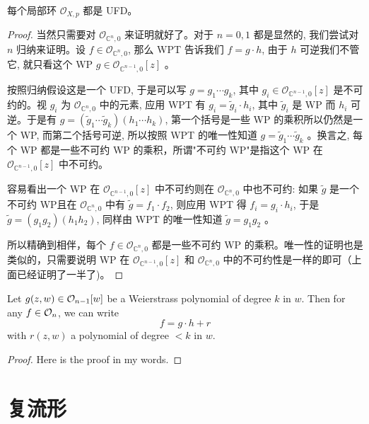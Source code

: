 \documentclass[lang=cn,12pt,a4paper,fontset=none]{beautybook}
\begin{document}
\begin{corollary}
   每个局部环 $\mathcal{O}_{X, p}$ 都是 UFD。
\end{corollary}
\begin{proof}
当然只需要对 $\mathcal{O}_{\mathbb{C}^n, 0}$ 来证明就好了。对于 $n=0,1$ 都是显然的, 我们尝试对 $n$ 归纳来证明。设 $f \in \mathcal{O}_{\mathbb{C}^n, 0}$, 那么 WPT 告诉我们 $f=g \cdot h$, 由于 $h$ 可逆我们不管它, 就只看这个 WP $g \in \mathcal{O}_{\mathbb{C}^{n-1}, 0}[z]$ 。

按照归纳假设这是一个 UFD, 于是可以写 $g=g_1 \cdots g_k$, 其中 $g_i \in \mathcal{O}_{\mathbb{C}^{n-1}, 0}[z]$ 是不可约的。视 $g_i$ 为 $\mathcal{O}_{\mathbb{C}^n, 0}$ 中的元素, 应用 WPT 有 $g_i=\tilde{g}_i \cdot h_i$, 其中 $\tilde{g}_i$ 是 WP 而 $h_i$ 可逆。于是有 $g=\left(\tilde{g}_1 \cdots \tilde{g}_k\right)\left(h_1 \cdots h_k\right)$, 第一个括号是一些 WP 的乘积所以仍然是一个 WP, 而第二个括号可逆, 所以按照 WPT 的唯一性知道 $g=\tilde{g}_1 \cdots \tilde{g}_k$ 。换言之, 每个 WP 都是一些不可约 WP 的乘积，所谓"不可约 WP"是指这个 WP 在 $\mathcal{O}_{\mathbb{C}^{n-1}, 0}[z]$ 中不可约。

容易看出一个 WP 在 $\mathcal{O}_{\mathbb{C}^{n-1}, 0}[z]$ 中不可约则在 $\mathcal{O}_{\mathbb{C}^n, 0}$ 中也不可约: 如果 $\tilde{g}$ 是一个不可约 WP且在 $\mathcal{O}_{\mathbb{C}^n, 0}$ 中有 $\tilde{g}=f_1 \cdot f_2$, 则应用 WPT 得 $f_i=g_i \cdot h_i$, 于是 $\tilde{g}=\left(g_1 g_2\right)\left(h_1 h_2\right)$, 同样由 WPT 的唯一性知道 $\tilde{g}=g_1 g_2$ 。

所以精确到相伴，每个 $f \in \mathcal{O}_{\mathbb{C}^n, 0}$ 都是一些不可约 WP 的乘积。唯一性的证明也是类似的，只需要说明 WP 在 $\mathcal{O}_{\mathbb{C}^{n-1}, 0}[z]$ 和 $\mathcal{O}_{\mathbb{C}^n, 0}$ 中的不可约性是一样的即可（上面已经证明了一半了)。
\end{proof}

      

\begin{theorem}
   Let $g(z,w)\in {\mathcal O}_{n-1}[w]$ be a Weierstrass polynomial of degree $k$ in $w$. Then for any $f\in {\mathcal O}_{n}$, we can write 
   \[f=g\cdot h+r\]
   with $r(z,w)$ a polynomial of degree $<k$ in $w$.
\end{theorem}
   \begin{proof}
      Here is the proof in my words. 
      
   \end{proof}

\section{复流形}
\end{document}
